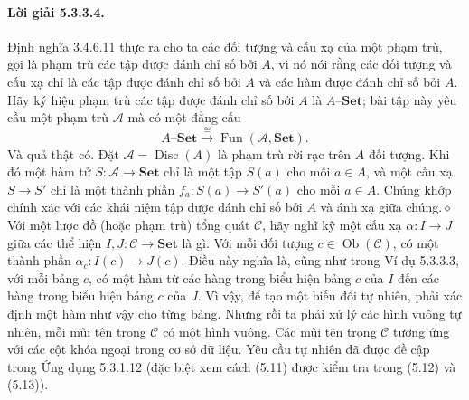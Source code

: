 \paragraph{Lời giải 5.3.3.4.} Định nghĩa 3.4.6.11 thực ra cho ta các đối tượng và cấu xạ của một phạm trù, gọi là phạm trù các tập được đánh chỉ số bởi $A$, vì nó nói rằng các đối tượng và cấu xạ chỉ là các tập được đánh chỉ số bởi $A$ và các hàm được đánh chỉ số bởi $A$. Hãy ký hiệu phạm trù các tập được đánh chỉ số bởi $A$ là $A\text{--}\mathbf{Set}$; bài tập này yêu cầu một phạm trù $\mathcal A$ mà có một đẳng cấu
\[A\text{--}\mathbf{Set}\xrightarrow{\cong}\operatorname{Fun}(\mathcal A,\mathbf{Set}).\]
Và quả thật có. Đặt $\mathcal A=\operatorname{Disc}(A)$ là phạm trù rời rạc trên $A$ đối tượng. Khi đó một hàm tử $S:\mathcal A\to\mathbf{Set}$ chỉ là một tập $S(a)$ cho mỗi $a\in A$, và một cấu xạ $S\to S'$ chỉ là một thành phần $f_a:S(a)\to S'(a)$ cho mỗi $a\in A$. Chúng khớp chính xác với các khái niệm tập được đánh chỉ số bởi $A$ và ánh xạ giữa chúng.\hfill$\diamond$
Với một lược đồ (hoặc phạm trù) tổng quát $\mathcal C$, hãy nghĩ kỹ một cấu xạ $\alpha:I\to J$ giữa các thể hiện $I,J:\mathcal C\to\mathbf{Set}$ là gì. Với mỗi đối tượng $c\in\operatorname{Ob}(\mathcal C)$, có một thành phần $\alpha_c:I(c)\to J(c)$. Điều này nghĩa là, cũng như trong Ví dụ 5.3.3.3, với mỗi bảng $c$, có một hàm từ các hàng trong biểu hiện bảng $c$ của $I$ đến các hàng trong biểu hiện bảng $c$ của $J$. Vì vậy, để tạo một biến đổi tự nhiên, phải xác định một hàm như vậy cho từng bảng. Nhưng rồi ta phải xử lý các hình vuông tự nhiên, mỗi mũi tên trong $\mathcal C$ có một hình vuông. Các mũi tên trong $\mathcal C$ tương ứng với các cột khóa ngoại trong cơ sở dữ liệu. Yêu cầu tự nhiên đã được đề cập trong Ứng dụng 5.3.1.12 (đặc biệt xem cách (5.11) được kiểm tra trong (5.12) và (5.13)).
